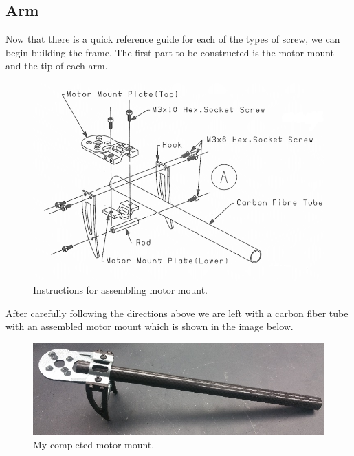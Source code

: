 \documentclass[10pt,notitlepage]{article}
\begin{document}
\subsection{Arm}
Now that there is a quick reference guide for each of the types of screw, we can begin building the frame. The first part to be constructed is the motor mount and the tip of each arm.

\begin{figure}[H]
	\centering
	\includegraphics[width=\textwidth]{Images/ArmOuter.png}
	\caption{Instructions for assembling motor mount.}
\end{figure}
After carefully following the directions above we are left with a carbon fiber tube with an assembled motor mount which is shown in the image below.

\begin{figure}[H]
	\centering
	\includegraphics[width=\textwidth]{Images/MyArm.jpg}
	\caption{My completed motor mount.}
\end{figure}
\end{document}
